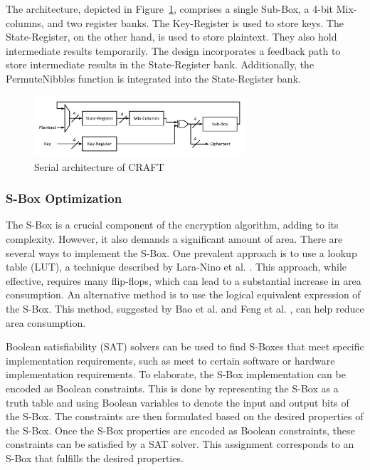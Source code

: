 \documentclass[final,5p,times,twocolumn]{elsarticle}
\begin{document}
The architecture, depicted in Figure~\ref{fig3}, comprises a single Sub-Box, a 4-bit Mix-columns, and two register banks.
The Key-Register is used to store keys. The State-Register, on the other hand, is used to store plaintext.
They also hold intermediate results temporarily.
The design incorporates a feedback path to store intermediate results in the State-Register bank.
Additionally, the PermuteNibbles function is integrated into the State-Register bank.


\begin{figure}[h]%
    \centering
    \includegraphics[width=0.7\textwidth]{./fig/serial-archticture.pdf}
    \caption{Serial architecture of CRAFT}\label{fig3}
\end{figure}


\subsubsection{S-Box Optimization }\label{subsubsec1}


The S-Box is a crucial component of the encryption algorithm, adding to its complexity.
However, it also demands a significant amount of area.
There are several ways to implement the S-Box.
One prevalent approach is to use a lookup table (LUT), a technique described by Lara-Nino et al. \cite{LaraNino2017}.
This approach, while effective, requires many flip-flops, which can lead to a substantial increase in area consumption.
An alternative method is to use the logical equivalent expression of the S-Box.
This method, suggested by Bao et al. \cite{bao2019peigen} and Feng et al. \cite{Feng2023}, can help reduce area consumption.

Boolean satisfiability (SAT) solvers can be used to find S-Boxes that meet specific implementation requirements, such as meet to certain software or hardware implementation requirements.
To elaborate, the S-Box implementation can be encoded as Boolean constraints.
This is done by representing the S-Box as a truth table and using Boolean variables to denote the input and output bits of the S-Box.
The constraints are then formulated based on the desired properties of the S-Box.
Once the S-Box properties are encoded as Boolean constraints, these constraints can be satisfied by a SAT solver.
This assignment corresponds to an S-Box that fulfills the desired properties.
\end{document}
